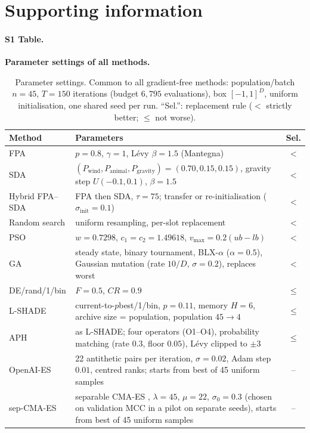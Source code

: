 \documentclass[10pt,letterpaper]{article}
\begin{document}
\section*{Supporting information}
\paragraph*{S1 Table.}\label{app:params} \textbf{Parameter settings of all methods.}
\begin{table}[H]
\centering
\caption{Parameter settings. Common to all gradient-free methods: population/batch $n=45$, $T=150$ iterations (budget $6{,}795$ evaluations), box $[-1,1]^D$, uniform initialisation, one shared seed per run. ``Sel.'': replacement rule ($<$ strictly better; $\le$ not worse).}
\label{tab:params}
\footnotesize
\begin{tabular}{p{2.6cm}p{8.6cm}c}
\toprule
Method & Parameters & Sel. \\
\midrule
FPA & $p=0.8$, $\gamma=1$, Lévy $\beta=1.5$ (Mantegna) & $<$ \\
SDA & $(P_{\mathrm{wind}},P_{\mathrm{animal}},P_{\mathrm{gravity}})=(0.70,0.15,0.15)$, gravity step $U(-0.1,0.1)$, $\beta=1.5$ & $<$ \\
Hybrid FPA--SDA & FPA then SDA, $\tau=75$; transfer or re-initialisation ($\sigma_{\mathrm{init}}=0.1$) & $<$ \\
Random search & uniform resampling, per-slot replacement & $<$ \\
PSO & $w=0.7298$, $c_1=c_2=1.49618$, $v_{\max}=0.2(ub-lb)$ & $<$ \\
GA & steady state, binary tournament, BLX-$\alpha$ ($\alpha=0.5$), Gaussian mutation (rate $10/D$, $\sigma=0.2$), replaces worst & $<$ \\
DE/rand/1/bin & $F=0.5$, $CR=0.9$ & $\le$ \\
L-SHADE & current-to-$p$best/1/bin, $p=0.11$, memory $H=6$, archive size = population, population $45\to4$ & $\le$ \\
APH & as L-SHADE; four operators (O1--O4), probability matching (rate $0.3$, floor $0.05$), Lévy clipped to $\pm3$ & $\le$ \\
OpenAI-ES & 22 antithetic pairs per iteration, $\sigma=0.02$, Adam step $0.01$, centred ranks; starts from best of 45 uniform samples & -- \\
sep-CMA-ES & separable CMA-ES \citep{ros2008sepcma}, $\lambda=45$, $\mu=22$, $\sigma_0=0.3$ (chosen on validation MCC in a pilot on separate seeds), starts from best of 45 uniform samples & -- \\

\end{tabular}
\end{table}
\end{document}
